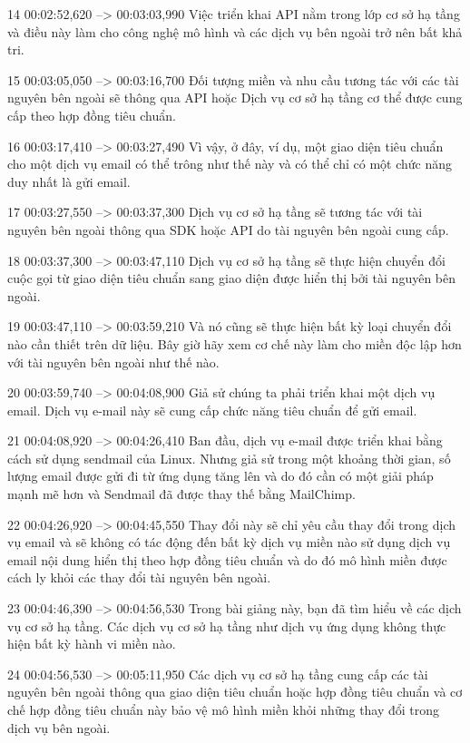 14
00:02:52,620 --> 00:03:03,990
Việc triển khai API nằm trong lớp cơ sở hạ tầng và điều này làm cho công nghệ mô hình và các dịch vụ bên ngoài trở nên bất khả tri.

15
00:03:05,050 --> 00:03:16,700
Đối tượng miền và nhu cầu tương tác với các tài nguyên bên ngoài sẽ thông qua API hoặc Dịch vụ cơ sở hạ tầng cơ thể được cung cấp theo hợp đồng tiêu chuẩn.

16
00:03:17,410 --> 00:03:27,490
Vì vậy, ở đây, ví dụ, một giao diện tiêu chuẩn cho một dịch vụ email có thể trông như thế này và có thể chỉ có một chức năng duy nhất là gửi email.

17
00:03:27,550 --> 00:03:37,300
Dịch vụ cơ sở hạ tầng sẽ tương tác với tài nguyên bên ngoài thông qua SDK hoặc API do tài nguyên bên ngoài cung cấp.

18
00:03:37,300 --> 00:03:47,110
Dịch vụ cơ sở hạ tầng sẽ thực hiện chuyển đổi cuộc gọi từ giao diện tiêu chuẩn sang giao diện được hiển thị bởi tài nguyên bên ngoài.

19
00:03:47,110 --> 00:03:59,210
Và nó cũng sẽ thực hiện bất kỳ loại chuyển đổi nào cần thiết trên dữ liệu.  Bây giờ hãy xem cơ chế này làm cho miền độc lập hơn với tài nguyên bên ngoài như thế nào.

20
00:03:59,740 --> 00:04:08,900
Giả sử chúng ta phải triển khai một dịch vụ email.  Dịch vụ e-mail này sẽ cung cấp chức năng tiêu chuẩn để gửi email.

21
00:04:08,920 --> 00:04:26,410
Ban đầu, dịch vụ e-mail được triển khai bằng cách sử dụng sendmail của Linux.  Nhưng giả sử trong một khoảng thời gian, số lượng email được gửi đi từ ứng dụng tăng lên và do đó cần có một giải pháp mạnh mẽ hơn và Sendmail đã được thay thế bằng MailChimp.

22
00:04:26,920 --> 00:04:45,550
Thay đổi này sẽ chỉ yêu cầu thay đổi trong dịch vụ email và sẽ không có tác động đến bất kỳ dịch vụ miền nào sử dụng dịch vụ email nội dung hiển thị theo hợp đồng tiêu chuẩn và do đó mô hình miền được cách ly khỏi các thay đổi tài nguyên bên ngoài.

23
00:04:46,390 --> 00:04:56,530
Trong bài giảng này, bạn đã tìm hiểu về các dịch vụ cơ sở hạ tầng.  Các dịch vụ cơ sở hạ tầng như dịch vụ ứng dụng không thực hiện bất kỳ hành vi miền nào.

24
00:04:56,530 --> 00:05:11,950
Các dịch vụ cơ sở hạ tầng cung cấp các tài nguyên bên ngoài thông qua giao diện tiêu chuẩn hoặc hợp đồng tiêu chuẩn và cơ chế hợp đồng tiêu chuẩn này bảo vệ mô hình miền khỏi những thay đổi trong dịch vụ bên ngoài.


